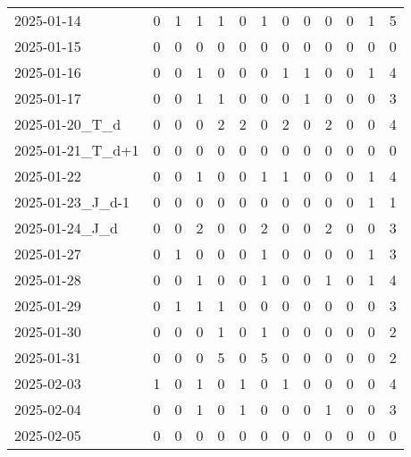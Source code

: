 \documentclass[dvipdfmx,oneside]{article}
\begin{document}
\begin{longtable}{lcccccccccccc}
        2025-01-14 &     0 &     1 &     1 &     1 &     0 &     1 &     0 &     0 &     0 &     0 &     1 &      5 \\
        2025-01-15 &     0 &     0 &     0 &     0 &     0 &     0 &     0 &     0 &     0 &     0 &     0 &      0 \\
        2025-01-16 &     0 &     0 &     1 &     0 &     0 &     0 &     1 &     1 &     0 &     0 &     1 &      4 \\
        2025-01-17 &     0 &     0 &     1 &     1 &     0 &     0 &     0 &     1 &     0 &     0 &     0 &      3 \\
  2025-01-20\_T\_d &     0 &     0 &     0 &     2 &     2 &     0 &     2 &     0 &     2 &     0 &     0 &      4 \\
2025-01-21\_T\_d+1 &     0 &     0 &     0 &     0 &     0 &     0 &     0 &     0 &     0 &     0 &     0 &      0 \\
        2025-01-22 &     0 &     0 &     1 &     0 &     0 &     1 &     1 &     0 &     0 &     0 &     1 &      4 \\
2025-01-23\_J\_d-1 &     0 &     0 &     0 &     0 &     0 &     0 &     0 &     0 &     0 &     0 &     1 &      1 \\
  2025-01-24\_J\_d &     0 &     0 &     2 &     0 &     0 &     2 &     0 &     0 &     2 &     0 &     0 &      3 \\
        2025-01-27 &     0 &     1 &     0 &     0 &     0 &     1 &     0 &     0 &     0 &     0 &     1 &      3 \\
        2025-01-28 &     0 &     0 &     1 &     0 &     0 &     1 &     0 &     0 &     1 &     0 &     1 &      4 \\
        2025-01-29 &     0 &     1 &     1 &     1 &     0 &     0 &     0 &     0 &     0 &     0 &     0 &      3 \\
        2025-01-30 &     0 &     0 &     0 &     1 &     0 &     1 &     0 &     0 &     0 &     0 &     0 &      2 \\
        2025-01-31 &     0 &     0 &     0 &     5 &     0 &     5 &     0 &     0 &     0 &     0 &     0 &      2 \\
        2025-02-03 &     1 &     0 &     1 &     0 &     1 &     0 &     1 &     0 &     0 &     0 &     0 &      4 \\
        2025-02-04 &     0 &     0 &     1 &     0 &     1 &     0 &     0 &     0 &     1 &     0 &     0 &      3 \\
        2025-02-05 &     0 &     0 &     0 &     0 &     0 &     0 &     0 &     0 &     0 &     0 &     0 &      0 \\

\end{longtable}
\end{document}
